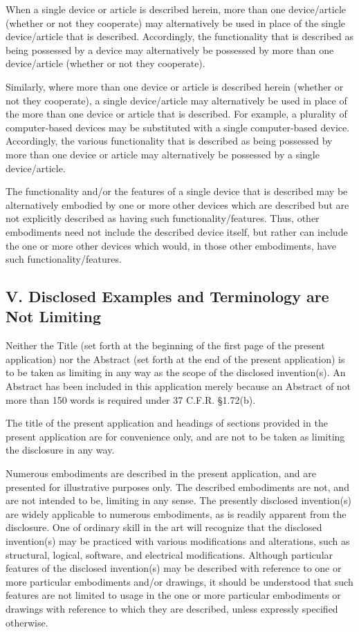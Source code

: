 \documentclass[11pt,a4paper]{article}
\begin{document}
When a single device or article is described herein, more than one device/article (whether or not they cooperate) may alternatively be used in place of the single device/article that is described. Accordingly, the functionality that is described as being possessed by a device may alternatively be possessed by more than one device/article (whether or not they cooperate).

Similarly, where more than one device or article is described herein (whether or not they cooperate), a single device/article may alternatively be used in place of the more than one device or article that is described. For example, a plurality of computer-based devices may be substituted with a single computer-based device. Accordingly, the various functionality that is described as being possessed by more than one device or article may alternatively be possessed by a single device/article.

The functionality and/or the features of a single device that is described may be alternatively embodied by one or more other devices which are described but are not explicitly described as having such functionality/features. Thus, other embodiments need not include the described device itself, but rather can include the one or more other devices which would, in those other embodiments, have such functionality/features.

\subsection{V. Disclosed Examples and Terminology are Not Limiting}

Neither the Title (set forth at the beginning of the first page of the present application) nor the Abstract (set forth at the end of the present application) is to be taken as limiting in any way as the scope of the disclosed invention(s). An Abstract has been included in this application merely because an Abstract of not more than 150 words is required under 37 C.F.R. §1.72(b).

The title of the present application and headings of sections provided in the present application are for convenience only, and are not to be taken as limiting the disclosure in any way.

Numerous embodiments are described in the present application, and are presented for illustrative purposes only. The described embodiments are not, and are not intended to be, limiting in any sense. The presently disclosed invention(s) are widely applicable to numerous embodiments, as is readily apparent from the disclosure. One of ordinary skill in the art will recognize that the disclosed invention(s) may be practiced with various modifications and alterations, such as structural, logical, software, and electrical modifications. Although particular features of the disclosed invention(s) may be described with reference to one or more particular embodiments and/or drawings, it should be understood that such features are not limited to usage in the one or more particular embodiments or drawings with reference to which they are described, unless expressly specified otherwise.
\end{document}
